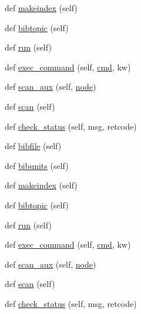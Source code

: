 \begin{DoxyCompactItemize}
\item 
def \hyperlink{classwaflib_1_1_tools_1_1tex_1_1tex_a037e014ad6faffb9d86bce5a13038776}{makeindex} (self)
\item 
def \hyperlink{classwaflib_1_1_tools_1_1tex_1_1tex_a91f60e48f7933bde8c62a1108c408f84}{bibtopic} (self)
\item 
def \hyperlink{classwaflib_1_1_tools_1_1tex_1_1tex_a9ca231d8975e3c1d5d3c9e455f31f892}{run} (self)
\item 
def \hyperlink{classwaflib_1_1_tools_1_1tex_1_1tex_af3bd4c7abea22374fe7cb435022880cd}{exec\+\_\+command} (self, \hyperlink{sndfile__play_8m_adfc5ba7e22f5e4a6221c12a70503bef3}{cmd}, kw)
\item 
def \hyperlink{classwaflib_1_1_tools_1_1tex_1_1tex_abd3866cf63c379f3bdd3e1568f32182a}{scan\+\_\+aux} (self, \hyperlink{structnode}{node})
\item 
def \hyperlink{classwaflib_1_1_tools_1_1tex_1_1tex_a9a1611c5caf6c5ef3bf0efbcd7cdb0b4}{scan} (self)
\item 
def \hyperlink{classwaflib_1_1_tools_1_1tex_1_1tex_ac5e3e5ed9bae28652ceec355e87c041b}{check\+\_\+status} (self, msg, retcode)
\item 
def \hyperlink{classwaflib_1_1_tools_1_1tex_1_1tex_a84f06095e6adb078c76849aaad9caaa7}{bibfile} (self)
\item 
def \hyperlink{classwaflib_1_1_tools_1_1tex_1_1tex_adc9975ca42cc99bdfed2453d0501deb7}{bibunits} (self)
\item 
def \hyperlink{classwaflib_1_1_tools_1_1tex_1_1tex_a037e014ad6faffb9d86bce5a13038776}{makeindex} (self)
\item 
def \hyperlink{classwaflib_1_1_tools_1_1tex_1_1tex_a91f60e48f7933bde8c62a1108c408f84}{bibtopic} (self)
\item 
def \hyperlink{classwaflib_1_1_tools_1_1tex_1_1tex_a9ca231d8975e3c1d5d3c9e455f31f892}{run} (self)
\item 
def \hyperlink{classwaflib_1_1_tools_1_1tex_1_1tex_af3bd4c7abea22374fe7cb435022880cd}{exec\+\_\+command} (self, \hyperlink{sndfile__play_8m_adfc5ba7e22f5e4a6221c12a70503bef3}{cmd}, kw)
\item 
def \hyperlink{classwaflib_1_1_tools_1_1tex_1_1tex_abd3866cf63c379f3bdd3e1568f32182a}{scan\+\_\+aux} (self, \hyperlink{structnode}{node})
\item 
def \hyperlink{classwaflib_1_1_tools_1_1tex_1_1tex_a9a1611c5caf6c5ef3bf0efbcd7cdb0b4}{scan} (self)
\item 
def \hyperlink{classwaflib_1_1_tools_1_1tex_1_1tex_ac5e3e5ed9bae28652ceec355e87c041b}{check\+\_\+status} (self, msg, retcode)

\end{DoxyCompactItemize}

